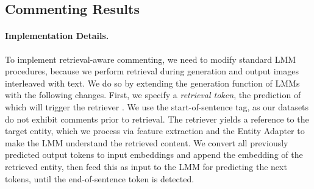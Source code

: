 \begin{table}[]
    \centering
\vspace*{-2mm}
\caption{\underline{Modality ablation study for entity encoding}. We compare results on \wikicomment using \modelname and RAG when removing images, captions and Wikipedia descriptions when providing the entities to the model.}
\label{tab:commenting_ablation_wiki}
\vspace*{-5mm}
\end{table}


\subsection{Commenting Results}
\label{ssec:exp_commenting} 

\paragraph{Implementation Details.} 
%
To implement retrieval-aware commenting, we need to modify standard LMM procedures, because we perform retrieval during generation and output images interleaved with text. We do so by extending the generation function of LMMs with the following changes.
%
First, we specify a \emph{retrieval token}, the prediction of which will trigger the retriever \retriever.
%
We use the start-of-sentence tag, as our \taskname datasets do not exhibit comments prior to retrieval.
The retriever yields a reference to the target entity, which we process via feature extraction and the Entity Adapter to make the LMM understand the retrieved content.
We convert all previously predicted output tokens to input embeddings and append the embedding of the retrieved entity, then feed this as input to the LMM for predicting the next tokens, until the end-of-sentence token is detected.


